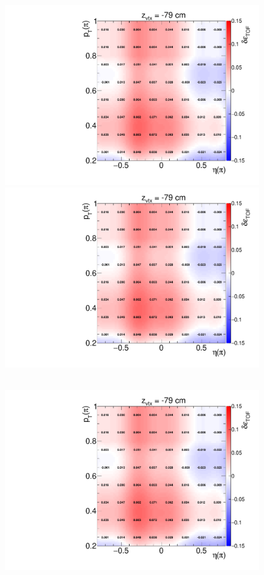 \begin{figure}
{		\includegraphics[width=\linewidth,page=30]{graphics/systematicsEfficiency/TOF_tagAndProbe/correction/TofEffCorrection3D_pion.pdf}\\
		\includegraphics[width=\linewidth,page=41]{graphics/systematicsEfficiency/TOF_tagAndProbe/correction/TofEffCorrection3D_pion.pdf}\\
	}~
	\parbox{0.325\textwidth}{
		\centering
		\includegraphics[width=\linewidth,page=5]{graphics/systematicsEfficiency/TOF_tagAndProbe/correction/TofEffCorrection3D_pion.pdf}\\
}
\end{figure}
